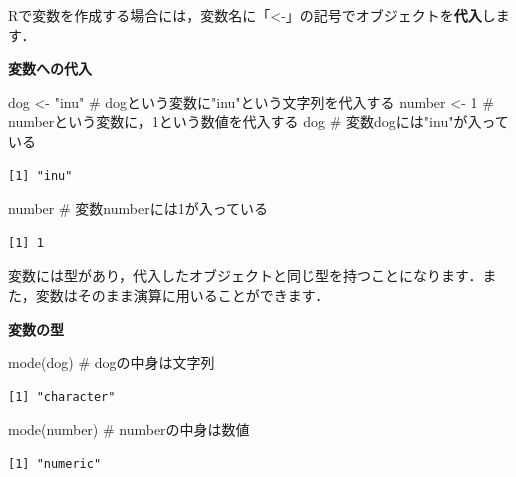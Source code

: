 \documentclass[
  letterpaper,
  DIV=11,
  numbers=noendperiod]{scrreprt}
\newenvironment{Shaded}{\begin{snugshade}}{\end{snugshade}}
\newcommand{\CommentTok}[1]{\textcolor[rgb]{0.37,0.37,0.37}{#1}}
\newcommand{\DecValTok}[1]{\textcolor[rgb]{0.68,0.00,0.00}{#1}}
\newcommand{\FunctionTok}[1]{\textcolor[rgb]{0.28,0.35,0.67}{#1}}
\newcommand{\NormalTok}[1]{\textcolor[rgb]{0.00,0.23,0.31}{#1}}
\newcommand{\OtherTok}[1]{\textcolor[rgb]{0.00,0.23,0.31}{#1}}
\newcommand{\StringTok}[1]{\textcolor[rgb]{0.13,0.47,0.30}{#1}}
\begin{document}
Rで変数を作成する場合には，変数名に「\textless-」の記号でオブジェクトを\textbf{代入}します．

\textbf{変数への代入}

\begin{Shaded}
\begin{Highlighting}[]
\NormalTok{dog }\OtherTok{\textless{}{-}} \StringTok{"inu"} \CommentTok{\# dogという変数に"inu"という文字列を代入する}
\NormalTok{number }\OtherTok{\textless{}{-}} \DecValTok{1} \CommentTok{\# numberという変数に，1という数値を代入する}
\NormalTok{dog }\CommentTok{\# 変数dogには"inu"が入っている}
\end{Highlighting}
\end{Shaded}

\begin{verbatim}
[1] "inu"
\end{verbatim}

\begin{Shaded}
\begin{Highlighting}[]
\NormalTok{number }\CommentTok{\# 変数numberには1が入っている}
\end{Highlighting}
\end{Shaded}

\begin{verbatim}
[1] 1
\end{verbatim}

変数には型があり，代入したオブジェクトと同じ型を持つことになります．また，変数はそのまま演算に用いることができます．

\textbf{変数の型}

\begin{Shaded}
\begin{Highlighting}[]
\FunctionTok{mode}\NormalTok{(dog) }\CommentTok{\# dogの中身は文字列}
\end{Highlighting}
\end{Shaded}

\begin{verbatim}
[1] "character"
\end{verbatim}

\begin{Shaded}
\begin{Highlighting}[]
\FunctionTok{mode}\NormalTok{(number) }\CommentTok{\# numberの中身は数値}
\end{Highlighting}
\end{Shaded}

\begin{verbatim}
[1] "numeric"
\end{verbatim}
\end{document}
